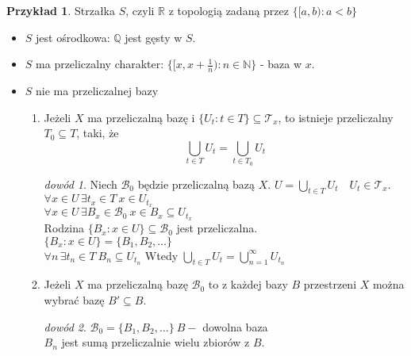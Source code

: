 \documentclass[twoside,10pt]{article}
\theoremstyle{definition}
\theoremstyle{definition}
\theoremstyle{definition}
\theoremstyle{definition}
\theoremstyle{remark}
\newtheorem*{dd}{dowód}
\theoremstyle{definition}
\theoremstyle{definition}
\theoremstyle{definition}
\theoremstyle{definition}
\newtheorem*{prz}{Przykład}
\theoremstyle{definition}
\theoremstyle{definition}
\begin{document}
\begin{prz} 
    Strzałka $S$, czyli $\mathbb R$ z topologią zadaną przez $\{ [a,b): a < b \}$ 
    \begin{itemize} 
        \item $S$ jest ośrodkowa: $\mathbb Q$ jest gęsty w $S$. 
        \item $S$ ma przeliczalny charakter: $\{ [x,x+\frac{1}{n}): n \in \mathbb N \}$ - baza w $x$.
        \item $S$ nie ma przeliczalnej bazy
            \begin{lem}  \hfill
                \begin{enumerate}[(1)] 
                    \item Jeżeli $X$ ma przeliczalną bazę i $\{U_t : t \in T\} \subseteq \mathcal T_x$, to 
                        istnieje przeliczalny $T_0 \subseteq T$, taki, że 
                        \[ \bigcup_{t \in T} U_t = \bigcup_{t \in T_0} U_t\]
                        \begin{dd} 
                            Niech $\mathcal B_0$ będzie przeliczalną bazą $X$. $U = \bigcup\limits_{t \in T} U_t
                            \quad U_t \in \mathcal T_x$. \\ 
                            $\forall x \in U \, \exists t_x \in T \ x \in U_{t_x}$ \\ 
                            $\forall x \in U \, \exists B_x \in \mathcal B_0 \ x \in B_x \subseteq U_{t_x}$ \\ 
                            Rodzina $\{B_x: x \in U \} \subseteq \mathcal B_0$ jest przeliczalna. \\ 
                            $\{B_x: x \in U\} = \{B_1,B_2,\ldots\}$ \\ 
                            $\forall n \, \exists t_n \in T \ B_n \subseteq U_{t_n}$
                            Wtedy $\bigcup\limits_{t \in T} U_t = \bigcup\limits_{n=1}^\infty U_{t_n}$
                        \end{dd} 
                    \item Jeżeli $X$ ma przeliczalną bazę $\mathcal B_0$ to z każdej bazy $B$ przestrzeni $X$
                        można wybrać bazę $B' \subseteq B$. 
                        \begin{dd} 
                            $\mathcal B_0 = \{ B_1,B_2,\ldots\} \ B - $ dowolna baza \\ 
                            $B_n$ jest sumą przeliczalnie wielu zbiorów z $B$. \\ 

\end{dd}
\end{enumerate}
\end{lem}
\end{itemize}
\end{prz}
\end{document}
